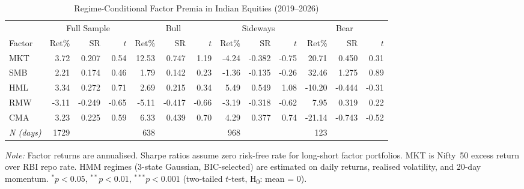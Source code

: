 \begin{table}[htbp]
\centering
\small
\caption{Regime-Conditional Factor Premia in Indian Equities (2019--2026)}
\label{tab:regime_factor_matrix}
\begin{tabular}{lrrrrrrrrrrrr}
\toprule
 & \multicolumn{3}{c}{Full Sample} & \multicolumn{3}{c}{Bull} & \multicolumn{3}{c}{Sideways} & \multicolumn{3}{c}{Bear} \\
\cmidrule(lr){2-4}\cmidrule(lr){5-7}\cmidrule(lr){8-10}\cmidrule(lr){11-13}
Factor & Ret\% & SR & $t$ & Ret\% & SR & $t$ & Ret\% & SR & $t$ & Ret\% & SR & $t$ \\
\midrule
MKT & 3.72 & 0.207 & 0.54 & 12.53 & 0.747 & 1.19 & -4.24 & -0.382 & -0.75 & 20.71 & 0.450 & 0.31 \\
SMB & 2.21 & 0.174 & 0.46 & 1.79 & 0.142 & 0.23 & -1.36 & -0.135 & -0.26 & 32.46 & 1.275 & 0.89 \\
HML & 3.34 & 0.272 & 0.71 & 2.69 & 0.215 & 0.34 & 5.49 & 0.549 & 1.08 & -10.20 & -0.444 & -0.31 \\
RMW & -3.11 & -0.249 & -0.65 & -5.11 & -0.417 & -0.66 & -3.19 & -0.318 & -0.62 & 7.95 & 0.319 & 0.22 \\
CMA & 3.23 & 0.225 & 0.59 & 6.33 & 0.439 & 0.70 & 4.29 & 0.377 & 0.74 & -21.14 & -0.743 & -0.52 \\
\midrule
\textit{N (days)} & 1729 &  &  & 638 &  &  & 968 &  &  & 123 &  &  \\
\bottomrule
\end{tabular}
\begin{tablenotes}
\small
\item \textit{Note:} Factor returns are annualised. Sharpe ratios assume zero risk-free rate for long-short factor portfolios. MKT is Nifty~50 excess return over RBI repo rate. HMM regimes (3-state Gaussian, BIC-selected) are estimated on daily returns, realised volatility, and 20-day momentum. $^{*}p < 0.05$, $^{**}p < 0.01$, $^{***}p < 0.001$ (two-tailed $t$-test, H\textsubscript{0}: mean = 0).
\end{tablenotes}
\end{table}